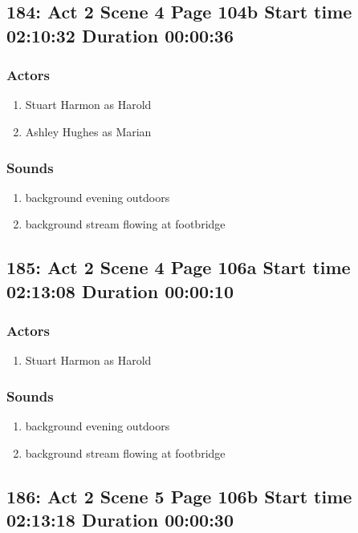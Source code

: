 \subsection{184: Act 2 Scene 4 Page 104b Start time 02:10:32 Duration 00:00:36}

\subsubsection{Actors}
\begin{enumerate}
\item Stuart Harmon as Harold
\item Ashley Hughes as Marian
\end{enumerate}

\subsubsection{Sounds}
\begin{enumerate}
\item background evening outdoors
\item background stream flowing at footbridge
\end{enumerate}
\subsection{185: Act 2 Scene 4 Page 106a Start time 02:13:08 Duration 00:00:10}

\subsubsection{Actors}
\begin{enumerate}
\item Stuart Harmon as Harold
\end{enumerate}

\subsubsection{Sounds}
\begin{enumerate}
\item background evening outdoors
\item background stream flowing at footbridge
\end{enumerate}
\subsection{186: Act 2 Scene 5 Page 106b Start time 02:13:18 Duration 00:00:30}

